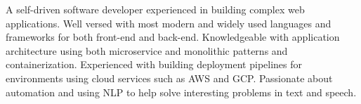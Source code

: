 

\begin{cvparagraph}

A self-driven software developer experienced in building complex web applications. Well versed with most modern and widely used languages and frameworks for both front-end and back-end. Knowledgeable with application architecture using both microservice and monolithic patterns and containerization. Experienced with building deployment pipelines for environments using cloud services such as AWS and GCP. Passionate about automation and using NLP to help solve interesting problems in text and speech.

\end{cvparagraph}